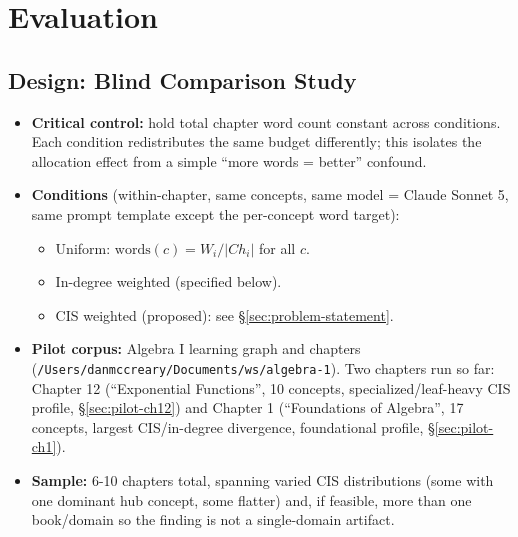 
\section{Evaluation}
\label{sec:evaluation}

\subsection{Design: Blind Comparison Study}
\begin{itemize}
    \item \textbf{Critical control:} hold total chapter word count constant across
          conditions. Each condition redistributes the same budget differently;
          this isolates the allocation effect from a simple ``more words = better''
          confound.
    \item \textbf{Conditions} (within-chapter, same concepts, same model = Claude
          Sonnet 5, same prompt template except the per-concept word target):
          \begin{itemize}
              \item[A --] Uniform: $\mathrm{words}(c) = W_i / |Ch_i|$ for all $c$.
              \item[B --] In-degree weighted (specified below).
              \item[C --] CIS weighted (proposed): see \S\ref{sec:problem-statement}.
          \end{itemize}
    \item \textbf{Pilot corpus:} Algebra I learning graph and chapters
          (\texttt{/Users/danmccreary/Documents/ws/algebra-1}). Two chapters
          run so far: Chapter 12 (``Exponential Functions'', 10 concepts,
          specialized/leaf-heavy CIS profile, \S\ref{sec:pilot-ch12}) and
          Chapter 1 (``Foundations of Algebra'', 17 concepts, largest
          CIS/in-degree divergence, foundational profile,
          \S\ref{sec:pilot-ch1}).
    \item \textbf{Sample:} 6-10 chapters total, spanning varied CIS distributions
          (some with one dominant hub concept, some flatter) and, if feasible, more
          than one book/domain so the finding is not a single-domain artifact.
\end{itemize}

